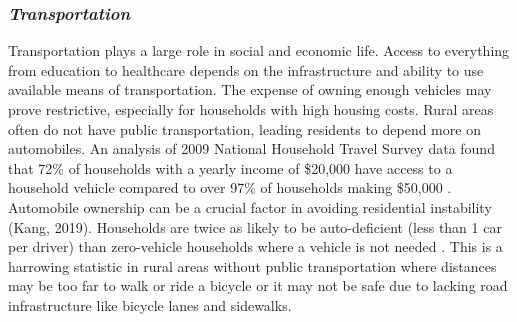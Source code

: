 \subsubsection{\textit{Transportation}} 
Transportation plays a large role in social and economic life. Access to everything from education to healthcare depends on the infrastructure and ability to use available means of transportation. The expense of owning enough vehicles may prove restrictive, especially for households with high housing costs. Rural areas often do not have public transportation, leading residents to depend more on automobiles. An analysis of 2009 National Household Travel Survey data found that 72\% of households with a yearly income of \$20,000 have access to a household vehicle compared to over 97\% of households making \$50,000 \citep{blumenberg_automobile_2012}. Automobile ownership can be a crucial factor in avoiding residential instability (Kang, 2019). Households are twice as likely to be auto-deficient (less than 1 car per driver) than zero-vehicle households where a vehicle is not needed \citep{blumenberg_car-deficit_2020}. This is a harrowing statistic in rural areas without public transportation where distances may be too far to walk or ride a bicycle or it may not be safe due to lacking road infrastructure like bicycle lanes and sidewalks.  

